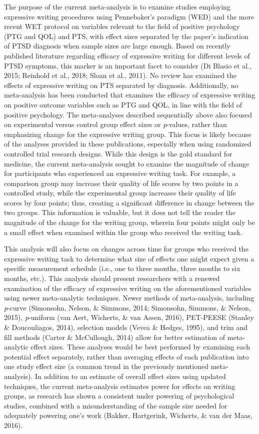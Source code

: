 \documentclass[man, mask]{apa6}
\theoremstyle{definition}
\theoremstyle{definition}
\theoremstyle{definition}
\theoremstyle{remark}
\begin{document}
The purpose of the current meta-analysis is to examine studies employing
expressive writing procedures using Pennebaker's paradigm (WED) and the
more recent WET protocol on variables relevant to the field of positive
psychology (PTG and QOL) and PTS, with effect sizes separated by the
paper's indication of PTSD diagnosis when sample sizes are large enough.
Based on recently published literature regarding efficacy of expressive
writing for different levels of PTSD symptoms, this marker is an
important facet to consider (Di Blasio et al., 2015; Reinhold et al.,
2018; Sloan et al., 2011). No review has examined the effects of
expressive writing on PTS separated by diagnosis. Additionally, no
meta-analysis has been conducted that examines the efficacy of
expressive writing on positive outcome variables such as PTG and QOL, in
line with the field of positive psychology. The meta-analyses described
sequentially above also focused on experimental versus control group
effect sizes or \emph{p}-values, rather than emphasizing change for the
expressive writing group. This focus is likely because of the analyses
provided in these publications, especially when using randomized
controlled trial research designs. While this design is the gold
standard for medicine, the current meta-analysis sought to examine the
magnitude of change for participants who experienced an expressive
writing task. For example, a comparison group may increase their quality
of life scores by two points in a controlled study, while the
experimental group increases their quality of life scores by four
points; thus, creating a significant difference in change between the
two groups. This information is valuable, but it does not tell the
reader the magnitude of the change for the writing group, wherein four
points might only be a small effect when examined within the group who
received the writing task.

This analysis will also focus on changes across time for groups who
received the expressive writing task to determine what size of effects
one might expect given a specific measurement schedule (i.e., one to
three months, three months to six months, etc.). This analysis should
present researchers with a renewed examination of the efficacy of
expressive writing on the aforementioned variables using newer
meta-analytic techniques. Newer methods of meta-analysis, including
\emph{p}-curve (Simonsohn, Nelson, \& Simmons, 2014; Simonsohn, Simmons,
\& Nelson, 2015), \emph{p}-uniform (van Aert, Wicherts, \& van Assen,
2016), PET-PEESE (Stanley \& Doucouliagos, 2014), selection models
(Vevea \& Hedges, 1995), and trim and fill methods (Carter \&
McCullough, 2014) allow for better estimation of meta-analytic effect
sizes. These analyses would be best performed by examining each
potential effect separately, rather than averaging effects of each
publication into one study effect size (a common trend in the previously
mentioned meta-analysis). In addition to an estimate of overall effect
sizes using updated techniques, the current meta-analysis estimates
power for effects on writing groups, as research has shown a consistent
under powering of psychological studies, combined with a
misunderstanding of the sample size needed for adequately powering one's
work (Bakker, Hartgerink, Wicherts, \& van der Maas, 2016).
\end{document}
